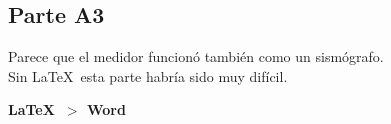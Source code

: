 \subsection{Parte A3}%
\label{sub:conclu_parte_a3}

Parece que el medidor funcionó también como un sismógrafo.\\
Sin \LaTeX\ esta parte habría sido muy difícil.
\begin{center}
	\textbf{\huge{\LaTeX\ $>$ Word}}
\end{center}
